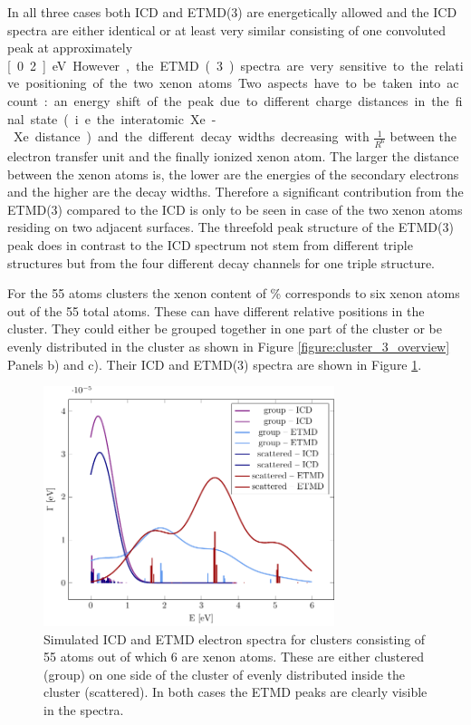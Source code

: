 In all three cases both ICD and ETMD(3) are energetically allowed and the ICD
spectra are either identical or at least very similar consisting of one
convoluted peak at approximately \unit[0.2]{eV}. However, the ETMD(3) spectra
are very sensitive to the relative positioning of the two xenon atoms.
Two aspects have to be taken into account: an energy shift of the peak due
to different charge distances in the final state (i.e. the interatomic Xe-Xe
distance) and the different decay widths decreasing with $\frac{1}{R^6}$
between the electron transfer unit and the finally ionized xenon atom.
The larger the distance between the xenon atoms is, the lower are the energies
of the secondary electrons and the higher are the decay widths. Therefore a
significant contribution from the ETMD(3) compared to the ICD is only
to be seen in case of the two xenon atoms residing on two adjacent
surfaces. The threefold peak structure of the ETMD(3) peak does in contrast to
the ICD spectrum not stem from different triple structures but from the
four different decay channels for one triple structure.


For the 55 atoms clusters the xenon content of \unit[10--12]{\%}
corresponds to six xenon atoms out of the 55 total atoms. These can have
different relative positions in the cluster. They could either be grouped
together in one part of the cluster or be evenly distributed in the cluster
as shown in Figure \ref{figure:cluster_3_overview} Panels b) and c). Their
ICD and ETMD(3) spectra are shown in Figure \ref{figure:ar_3_6in}.

\begin{figure}[h]
 \centering
 \includegraphics[width=8.5cm]{pics/ar_3_6in.pdf}
 \caption{Simulated ICD and ETMD electron spectra for clusters consisting of
          55 atoms out of which 6 are xenon atoms. These are either clustered
          (group) on one side of the cluster of evenly distributed
          inside the cluster (scattered). In both cases the ETMD peaks are
          clearly visible in the spectra.}
 \label{figure:ar_3_6in}
\end{figure}

